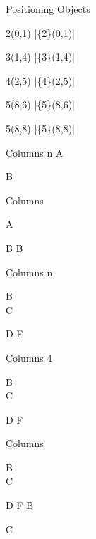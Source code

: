 \documentclass[english,notes]{beamer}
\begin{document}
\newcommand{\testbox}[2]{%
    \begin{textblock}{#1}(#2)
        |\{#1\}(#2)\hfill |
    \end{textblock}
}

\begin{frame}{Positioning Objects}
\testbox{2}{0,1}
\testbox{3}{1,4}
\testbox{4}{2,5}
\testbox{5}{8,6}
\testbox{5}{8,8}
\end{frame}

\makeatletter
\ikr@gridfalse
\makeatother

\begin{frame}{Columns n}
A

B
\end{frame}

\begin{frame}{Columns}
    \begin{cols}
            A

            B
            B
    \end{cols}
\end{frame}

\begin{frame}{Columns n}

B\\
C

D
F
\end{frame}

\begin{frame}{Columns 4}
    \begin{cols}

            B\\
            C

            D
            F
    \end{cols}
\end{frame}

\begin{frame}{Columns}
    \begin{cols}

            B\\
            C

            D
            F
            B

            C
    \end{cols}
\end{frame}
\end{document}
